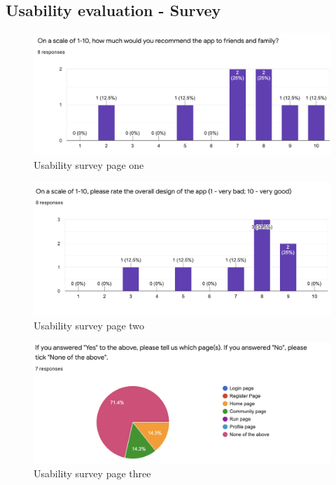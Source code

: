 \documentclass{l4proj}
\begin{document}
%
% 

\begin{appendices}

\chapter{Usability evaluation - Survey} \label{appendixsurvey}

\begin{figure}[h!]
    \centering
    \includegraphics[scale=0.55]{images/Screenshot 2022-02-17 at 11.17.49 pm.png}
    \caption{Usability survey page one}
    \label{fig:surveypage1}
\end{figure}

\begin{figure}[h!]
    \centering
    \includegraphics[scale=0.6]{images/Screenshot 2022-02-17 at 11.17.46 pm.png}
    \caption{Usability survey page two}
    \label{fig:surveypage2}
\end{figure}

\begin{figure}[h!]
    \centering
    \includegraphics[scale=0.6]{images/Screenshot 2022-02-17 at 11.17.44 pm.png} 
    \caption{Usability survey page three}
    \label{fig:surveypage3}
\end{figure}


\end{appendices}
\end{document}
